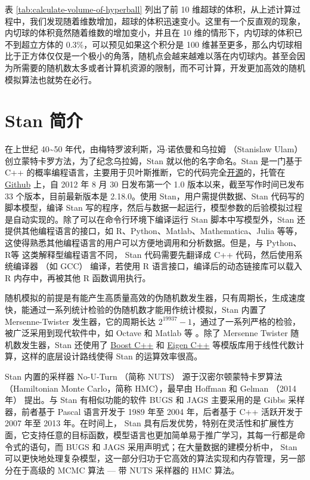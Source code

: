 \documentclass[12pt,a4paper,UTF8,twoside]{book}
\theoremstyle{definition}
\theoremstyle{definition}
\theoremstyle{definition}
\theoremstyle{remark}
\begin{document}
表 \ref{tab:calculate-volume-of-hyperball} 列出了前 10
维超球的体积，从上述计算过程中，我们发现随着维数增加，超球的体积迅速变小。这里有一个反直观的现象，内切球的体积竟然随着维数的增加变小，并且在
10 维的情形下，内切球的体积已不到超立方体的
0.3\%，可以预见如果这个积分是 100
维甚至更多，那么内切球相比于正方体仅仅是一个极小的角落，随机点会越来越难以落在内切球内。甚至会因为所需要的随机数太多或者计算机资源的限制，而不可计算，开发更加高效的随机模拟算法也就势在必行。

\hypertarget{sec:stan-samplers}{%
\section{Stan 简介}\label{sec:stan-samplers}}

在上世纪 40\textasciitilde{}50
年代，由梅特罗波利斯，冯\(\cdot\)诺依曼和乌拉姆 （Stanislaw Ulam）
创立蒙特卡罗方法，为了纪念乌拉姆，Stan 就以他的名字命名。Stan 是一门基于
C++
的概率编程语言，主要用于贝叶斯推断，它的代码完全\href{http://mc-stan.org/}{开源}的，托管在
\href{https://github.com/stan-dev/stan}{Github} 上，自 2012 年 8 月 30
日发布第一个 1.0 版本以来，截至写作时间已发布 33 个版本，目前最新版本是
2.18.0。使用 Stan，用户需提供数据、Stan 代码写的脚本模型，编译 Stan
写的程序，然后与数据一起运行，模型参数的后验模拟过程是自动实现的。除了可以在命令行环境下编译运行
Stan 脚本中写模型外，Stan 还提供其他编程语言的接口，如
R、Python、Matlab、Mathematica、Julia
等等，这使得熟悉其他编程语言的用户可以方便地调用和分析数据。但是，与
Python、R等 这类解释型编程语言不同， Stan 代码需要先翻译成 C++
代码，然后使用系统编译器 （如 GCC） 编译，若使用 R
语言接口，编译后的动态链接库可以载入 R 内存中，再被其他 R 函数调用执行。

随机模拟的前提是有能产生高质量高效的伪随机数发生器，只有周期长，生成速度快，能通过一系列统计检验的伪随机数才能用作统计模拟，Stan
内置了 Mersenne-Twister 发生器，它的周期长达
\(2^{19937}-1\)，通过了一系列严格的检验，被广泛采用到现代软件中，如
Octave 和 Matlab 等 \citep{Huang2017COS}。除了 Mersenne Twister
随机数发生器，Stan 还使用了 \href{https://www.boost.org/}{Boost C++} 和
\href{http://eigen.tuxfamily.org/index.php?title=Main_Page}{Eigen C++}
等模版库用于线性代数计算，这样的底层设计路线使得 Stan 的运算效率很高。

Stan 内置的采样器 No-U-Turn （简称 NUTS） 源于汉密尔顿蒙特卡罗算法
（Hamiltonian Monte Carlo，简称 HMC），最早由 Hoffman 和 Gelman
（2014年） \citep{hoffman2014} 提出。与 Stan 有相似功能的软件 BUGS 和
JAGS 主要采用的是 Gibbs 采样器，前者基于 Pascal 语言开发于 1989 年至
2004 年，后者基于 C++ 活跃开发于 2007 年至 2013 年。在时间上， Stan
具有后发优势，特别在灵活性和扩展性方面，它支持任意的目标函数，模型语言也更加简单易于推广学习，其每一行都是命令式的语句，而
BUGS 和 JAGS 采用声明式；在大量数据的建模分析中， Stan
可以更快地处理复杂模型，这一部分归功于它高效的算法实现和内存管理，另一部分在于高级的
MCMC 算法 --- 带 NUTS 采样器的 HMC 算法。
\end{document}
